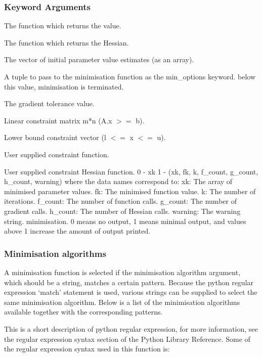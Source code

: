 \subsubsection{Keyword Arguments}

  The function which returns the value.

  The function which returns the Hessian.

  The vector of initial parameter value estimates (as an array).

  A tuple to pass to the minimisation function as the min\_options keyword.
below this value, minimisation is terminated.

  The gradient tolerance value.

  Linear constraint matrix m*n (A.x $>=$ b).

  Lower bound constraint vector (l $<=$ x $<=$ u).

  User supplied constraint function.

  User supplied constraint Hessian function.
 0 - xk 1 - (xk, fk, k, f\_count, g\_count, h\_count, warning) where the data names correspond to: xk:      The array of minimised parameter values. fk:      The minimised function value. k:       The number of iterations. f\_count: The number of function calls. g\_count: The number of gradient calls. h\_count: The number of Hessian calls. warning: The warning string.
minimisation.  0 means no output, 1 means minimal output, and values above 1 increase the amount
of output printed.


\subsubsection{Minimisation algorithms}

A minimisation function is selected if the minimisation algorithm argument, which should be a
string, matches a certain pattern.  Because the python regular expression `match' statement is
used, various strings can be supplied to select the same minimisation algorithm.  Below is a
list of the minimisation algorithms available together with the corresponding patterns.

This is a short description of python regular expression, for more information, see the
regular expression syntax section of the Python Library Reference.  Some of the regular
expression syntax used in this function is:

